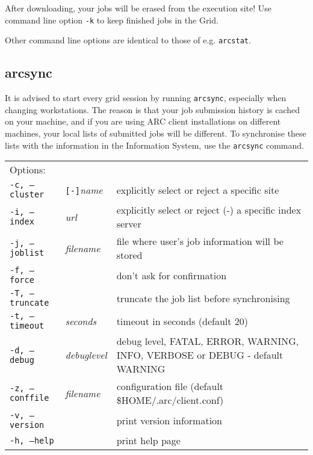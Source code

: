 \begin{framed}
 After downloading, your jobs will be erased from the execution site! Use command line option \verb#-k#
 to keep finished jobs in the Grid.
\end{framed}

Other command line options are identical to those of e.g. \verb#arcstat#.

\subsection{arcsync}
\label{sec:arcsync}

It is advised to start every grid session by running \texttt{arcsync},
especially when changing workstations. The reason is that your job submission
history is cached on your machine, and if you are using ARC client
installations on different machines, your local lists of submitted jobs will be different. To synchronise
these lists with the information in the Information System, use the
\texttt{arcsync}  command.

\hspace*{0.5cm}
\begin{shaded}
\end{shaded}
\begin{longtable}{llp{8cm}}
   Options:&&\\
   \texttt{-c, --cluster}&\verb#[-]#\textit{name}&explicitly select or reject a specific site\\
   \texttt{-i, --index}&\textit{url}&explicitly select or reject (-) a specific index server\\
   \texttt{-j, --joblist}&\textit{filename}&file where user's job information will be stored\\
   \texttt{-f, --force}& &don't ask for confirmation\\
   \texttt{-T, --truncate}& &truncate the job list before synchronising\\
   \texttt{-t, --timeout}&\textit{seconds}&timeout in seconds (default 20)\\
   \texttt{-d, --debug}&\textit{debuglevel}&debug level, FATAL, ERROR, WARNING, INFO, VERBOSE or DEBUG - default WARNING\\
   \texttt{-z, --conffile}&\textit{filename}& configuration file (default {\$}HOME/.arc/client.conf)\\
   \texttt{-v, --version}&&print version information\\
   \texttt{-h, --help}&&print help page\\
\end{longtable}

